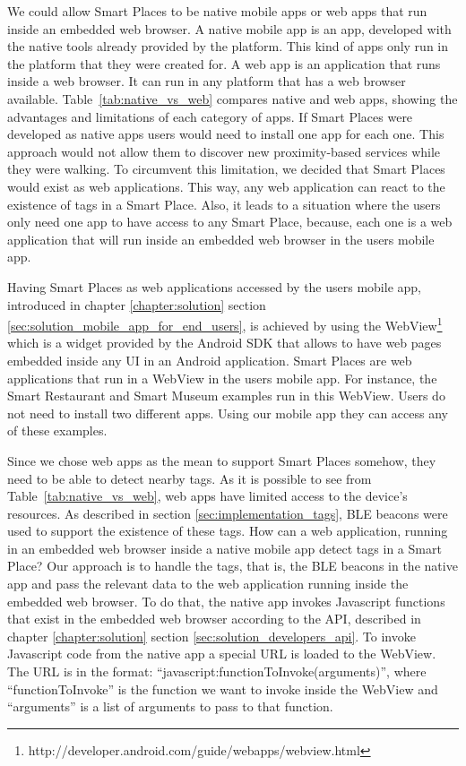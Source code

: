 We could allow Smart Places to be native mobile apps or web apps that run inside an embedded web browser.
A native mobile app is an app, developed with the native tools already provided by the platform.
This kind of apps only run in the platform that they were created for.
A web app is an application that runs inside a web browser. It can run in any platform that has a web browser available.
Table~\ref{tab:native_vs_web} compares native and web apps, showing the advantages and limitations of each category of apps.
If Smart Places were developed as native apps users would need to install one app for each one.
This approach would not allow them to discover new proximity-based services while they were walking.
To circumvent this limitation, we decided that Smart Places would exist as web applications.
This way, any web application can react to the existence of tags in a Smart Place. Also, it leads to a situation where the users only need one app to have access to any Smart Place, because, each one is a web application that will run inside an embedded web browser in the users mobile app.


Having Smart Places as web applications accessed by the users mobile app, introduced in chapter \ref{chapter:solution} section \ref{sec:solution_mobile_app_for_end_users}, is achieved by using the WebView\footnote{http://developer.android.com/guide/webapps/webview.html} which is a widget provided by the Android \gls{SDK} that allows to have web pages embedded inside any \gls{UI} in an Android application.
Smart Places are web applications that run in a WebView in the users mobile app.
For instance, the Smart Restaurant and Smart Museum examples run in this WebView.
Users do not need to install two different apps.
Using our mobile app they can access any of these examples.

Since we chose web apps as the mean to support Smart Places somehow, they need to be able to detect nearby tags.
As it is possible to see from Table~\ref{tab:native_vs_web}, web apps have limited access to the device's resources.
As described in section \ref{sec:implementation_tags}, \gls{BLE} beacons were used to support the existence of these tags.
How can a web application, running in an embedded web browser inside a native mobile app detect tags in a Smart Place?
Our approach is to handle the tags, that is, the \gls{BLE} beacons in the native app and pass the relevant data to the web application running inside the embedded web browser.
To do that, the native app invokes Javascript functions that exist in the embedded web browser according to the \gls{API}, described in chapter \ref{chapter:solution} section \ref{sec:solution_developers_api}.
To invoke Javascript code from the native app a special \gls{URL} is loaded to the WebView.
The \gls{URL} is in the format: ``javascript:functionToInvoke(arguments)'', where ``functionToInvoke'' is the function we want to invoke inside the WebView and ``arguments'' is a list of arguments to pass to that function.

